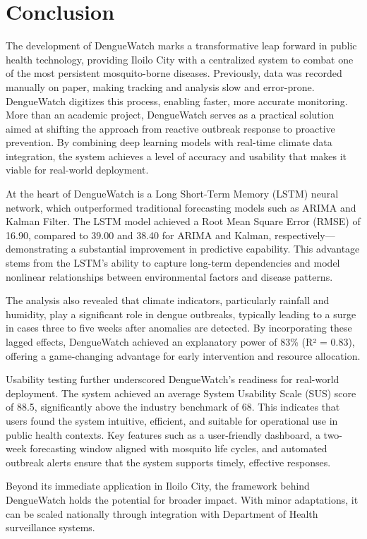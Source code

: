 \chapter{Conclusion}

The development of DengueWatch marks a transformative leap forward in public health technology, providing Iloilo City with a centralized system to combat one of the most persistent mosquito-borne diseases. Previously, data was recorded manually on paper, making tracking and analysis slow and error-prone. DengueWatch digitizes this process, enabling faster, more accurate monitoring. More than an academic project, DengueWatch serves as a practical solution aimed at shifting the approach from reactive outbreak response to proactive prevention. By combining deep learning models with real-time climate data integration, the system achieves a level of accuracy and usability that makes it viable for real-world deployment.

At the heart of DengueWatch is a Long Short-Term Memory (LSTM) neural network, which outperformed traditional forecasting models such as ARIMA and Kalman Filter. The LSTM model achieved a Root Mean Square Error (RMSE) of 16.90, compared to 39.00 and 38.40 for ARIMA and Kalman, respectively—demonstrating a substantial improvement in predictive capability. This advantage stems from the LSTM's ability to capture long-term dependencies and model nonlinear relationships between environmental factors and disease patterns.

The analysis also revealed that climate indicators, particularly rainfall and humidity, play a significant role in dengue outbreaks, typically leading to a surge in cases three to five weeks after anomalies are detected. By incorporating these lagged effects, DengueWatch achieved an explanatory power of 83\% (R² = 0.83), offering a game-changing advantage for early intervention and resource allocation.

Usability testing further underscored DengueWatch’s readiness for real-world deployment. The system achieved an average System Usability Scale (SUS) score of 88.5, significantly above the industry benchmark of 68. This indicates that users found the system intuitive, efficient, and suitable for operational use in public health contexts. Key features such as a user-friendly dashboard, a two-week forecasting window aligned with mosquito life cycles, and automated outbreak alerts ensure that the system supports timely, effective responses.

Beyond its immediate application in Iloilo City, the framework behind DengueWatch holds the potential for broader impact. With minor adaptations, it can be scaled nationally through integration with Department of Health surveillance systems.

